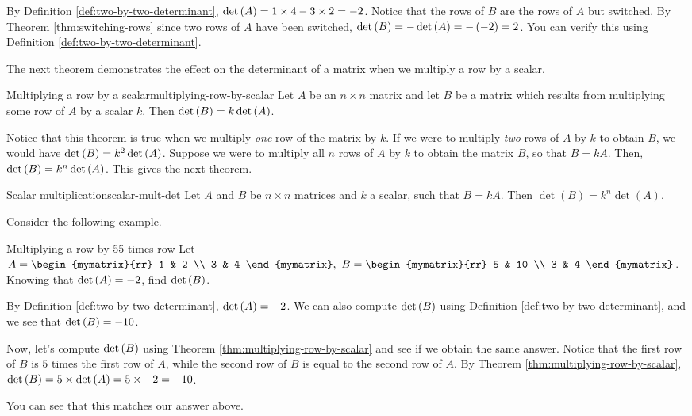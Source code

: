 \begin{solution}
By Definition \ref{def:two-by-two-determinant}, 
$\det \left(A\right) = 1 \times 4 - 3 \times 2 = -2$. 
Notice that the rows of $B$ are the rows of $A$ but switched. 
By Theorem \ref{thm:switching-rows} since two rows of $A$ have been switched,
$\det \left(B\right) = - \det \left(A\right) = - \left(-2\right) = 2$.
You can verify this using Definition \ref{def:two-by-two-determinant}. 
\end{solution}

The next theorem demonstrates the effect on the determinant of a matrix when we multiply
a row by a scalar.

\begin{theorem}{Multiplying a row by a scalar}{multiplying-row-by-scalar}
Let $A$ be an $n\times n$ matrix and let $B$ be a matrix
which results from multiplying some row of $A$ by a scalar $k$. Then $\det
\left(B\right) = k \det \left(A\right)$.
\end{theorem}

Notice that this theorem is true when we multiply {\em one\em} row of the matrix by $k$.
If we were to multiply {\em two\em} rows of $A$ by $k$ to obtain $B$, we would have
$\det \left(B\right) = k^2 \det \left(A\right)$.
Suppose we were to multiply all $n$ rows of $A$ by $k$ to obtain the matrix $B$, so that 
$B = kA$. Then, $\det \left(B\right) = k^n \det \left(A\right)$. This gives the next theorem.

\begin{theorem}{Scalar multiplication}{scalar-mult-det}
Let $A$ and $B$ be $n \times n$ matrices and $k$ a scalar, such that $B = kA$. Then $\det(B) = k^n \det(A)$.
\end{theorem}

Consider the following example.

\begin{example}{Multiplying a row by 5}{5-times-row}
Let $A=\begin{mymatrix}{rr}
1 & 2 \\
3 & 4
\end{mymatrix} ,\ B=\begin{mymatrix}{rr}
5 & 10 \\
3 & 4
\end{mymatrix}$. 
Knowing that $\det \left(A \right) =-2$, find  $\det \left(B \right)$.
\end{example}

\begin{solution} 
By Definition \ref{def:two-by-two-determinant}, $\det \left(A\right) =-2$. We can also compute
$\det \left(B\right)$ using Definition \ref{def:two-by-two-determinant}, and we see that $\det \left(B\right) = -10$. 

Now, let's compute  $\det \left(B\right)$ using Theorem \ref{thm:multiplying-row-by-scalar} and see if we
obtain the same answer. Notice that the first row of $B$ is $5$ times the first row of $A$, while the
second row of $B$ is equal to the second row of $A$. 
By Theorem \ref{thm:multiplying-row-by-scalar}, 
$\det  \left(B \right) = 5 \times \det \left(A \right) = 5 \times -2 = -10$.

You can see that this matches our answer above.
\end{solution}

